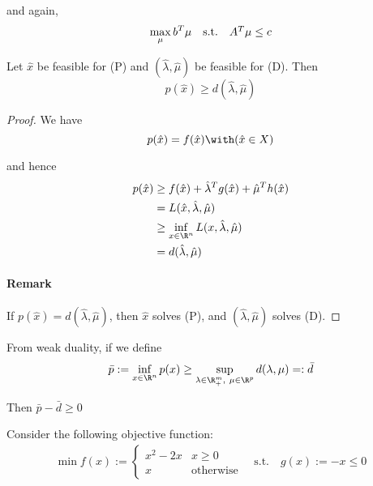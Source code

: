 and again,
$$\begin{array}{l l l}\displaystyle
    \max_\mu b^T\mu & \text{s.t.} & A^T\mu\leq c
  \end{array}$$


\label{ad0b792}

Let $\hat x$ be feasible for (P) and $(\hat\lambda,\hat\mu)$ be feasible for
(D). Then
$$
  p(\hat x)\geq d(\hat\lambda,\hat\mu)
$$

\begin{proof}
  \def\hx{\hat x}
  \def\hl{\hat\lambda}
  \def\hm{\hat\mu}
  We have
  $$
    p(\hx) = f(\hx)\with(\hx\in X)
  $$

  and hence
  \begin{align*}
    p(\hx) & \geq f(\hx) + \hl^Tg(\hx) + \hm^Th(\hx) \\
           & =L(\hx,\hl,\hm)                         \\
           & \geq\inf_{x\in\R^n}L(x,\hl,\hm)         \\
           & = d(\hl,\hm)
  \end{align*}

  \paragraph{Remark} If $p(\hx)=d(\hl,\hm)$, then $\hx$ solves (P), and $(\hl,\hm)$ solves (D).
\end{proof}

From weak duality, if we define
\begin{align*}
  \bar p:=\inf_{x\in\R^n}p(x)\geq
  \sup_{\lambda\in\R^m_+,\ \mu\in\R^p}d(\lambda,\mu)
  =:\bar d
\end{align*}

Then $\bar p-\bar d\geq0$

\label{c4aaa1f}


Consider the following objective function:
\begin{align*}
  \min f(x):=\begin{cases}
               x^2-2x & x\geq0           \\
               x      & \text{otherwise}
             \end{cases}
  \quad \text{s.t.}\quad g(x):=-x\leq0
\end{align*}

